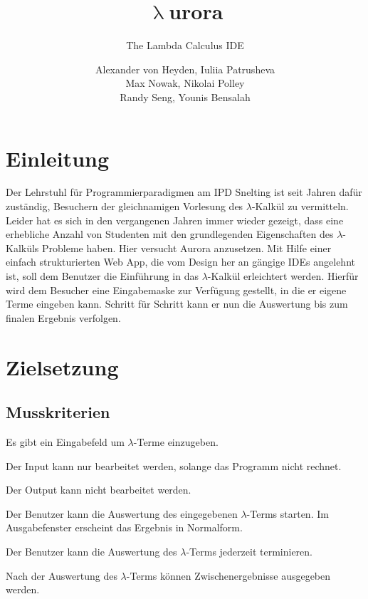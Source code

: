 \documentclass[parskip=full,11pt,twoside]{scrartcl}
\title{\textbf{$\uplambda$}urora}
\subtitle{The Lambda Calculus IDE}
\author{Alexander von Heyden, Iuliia Patrusheva\\
 Max Nowak, Nikolai Polley\\
 Randy Seng, Younis Bensalah}
\begin{document}
\maketitle
\newpage
\tableofcontents

\newpage
\section{Einleitung}
Der Lehrstuhl für Programmierparadigmen am IPD Snelting ist seit Jahren dafür zuständig, Besuchern der gleichnamigen Vorlesung des $\lambda$-Kalkül zu vermitteln. Leider hat es sich in den vergangenen Jahren immer wieder gezeigt, dass eine erhebliche Anzahl von Studenten mit den grundlegenden Eigenschaften des $\lambda$-Kalküls Probleme haben. Hier versucht Aurora anzusetzen. Mit Hilfe einer einfach strukturierten Web App, die vom Design her an gängige IDEs angelehnt ist, soll dem Benutzer die Einführung in das $\lambda$-Kalkül erleichtert werden. Hierfür wird dem Besucher eine Eingabemaske zur Verfügung gestellt, in die er eigene Terme eingeben kann. Schritt für Schritt kann er nun die Auswertung bis zum finalen Ergebnis verfolgen.


\newpage
\section{Zielsetzung}

\subsection{Musskriterien}

Es gibt ein Eingabefeld um $\lambda$-Terme einzugeben.

Der Input kann nur bearbeitet werden, solange das Programm nicht rechnet.

Der Output kann nicht bearbeitet werden.

Der Benutzer kann die Auswertung des eingegebenen $\lambda$-Terms starten. Im Ausgabefenster erscheint das Ergebnis in Normalform.

Der Benutzer kann die Auswertung des $\lambda$-Terms jederzeit terminieren.

Nach der Auswertung des $\lambda$-Terms können Zwischenergebnisse ausgegeben werden.
\end{document}
